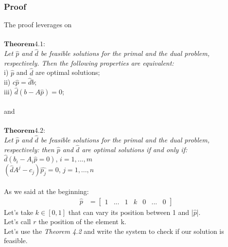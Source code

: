 \documentclass[1pt]{article}
\begin{document}
	\subsubsection{Proof}
	The proof leverages on \\\\
	\emph{$\boldsymbol{Theorem 4.1}$}: \\
	\emph{Let $\hat{p}$ and $\hat{d}$ be feasible solutions for the primal and the dual problem, \\respectively. Then the following properties are equivalent:}\\
	i) $\hat{p}$ and $\hat{d}$ are optimal solutions;\\
	ii) $c\hat{p} = \hat{d}b$;\\
	iii) $\hat{d}(b-A\hat{p}) = 0$;\\\\
	and\\\\
	\emph{$\boldsymbol{Theorem 4.2}$}: \\
	\emph{Let $\hat{p}$ and $\hat{d}$ be feasible solutions for the primal and the dual problem, \\respectively: then $\hat{p}$ and $\hat{d}$ are optimal solutions if and only if:}\\
	$\hat{d}(b_i-A_i\hat{p} = 0)$, $i=1,...,m$\\
	$(\hat{d}A^j-c_j)\hat{p_j} = 0$, $j=1,...,n$\\\\
	As we said at the beginning:
		\begin{align}
	\hat{p} &= \begin{bmatrix}
			1 & ... & 1 & k & 0 & ... & 0
	     \end{bmatrix}
	\end{align}
	Let's take $k \in [0,1]$ that can vary its position between 1 and |$\hat{p}$|.\\
	Let's call $r$ the position of the element k.\\
	Let's use the \emph{Theorem 4.2} and write the system to check if our solution is feasible.\\
\end{document}
